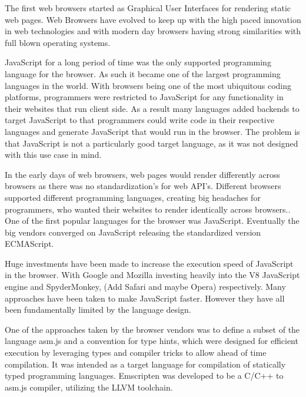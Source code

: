\documentclass[11pt]{book}
\begin{document}
The first web browsers started as Graphical User Interfaces for rendering static web pages. Web Browsers have evolved to keep up with the high paced innovation in web technologies and with modern day browsers having strong similarities with full blown operating systems. 


JavaScript for a long period of time was the only supported programming language for the browser. As such it became one of the largest programming languages in the world. With browsers being one of the most ubiquitous coding platforms, programmers were restricted to JavaScript for any functionality in their websites that run client side. As a result many languages added backends to target JavaScript to that programmers could write code in their respective languages and generate JavaScript that would run in the browser. The problem is that JavaScript is not a particularly good target language, as it was not designed with this use case in mind. 

In the early days of web browsers, web pages would render differently across browsers as there was no standardization's for web API's. Different browsers supported different programming languages, creating big headaches for programmers, who wanted their websites to render identically across browsers.. One of the first popular languages for the browser was JavaScript. Eventually the big vendors converged on JavaScript releasing the standardized version ECMAScript. 

Huge investments have been made to increase the execution speed of JavaScript in the browser. With Google and Mozilla investing heavily into the V8 JavaScript engine and SpyderMonkey, (Add Safari and maybe Opera) respectively. Many approaches have been taken to make JavaScript faster. However they have all been fundamentally limited by the language design. 


One of the approaches taken by the browser vendors was to define a subset of the language asm.js and a convention for type hints, which were designed for efficient execution by leveraging types and compiler tricks to allow ahead of time compilation. It was intended as a target language for compilation of statically typed programming languages. Emscripten was developed to be a C/C++ to asm.js compiler, utilizing the LLVM toolchain. 
\end{document}
